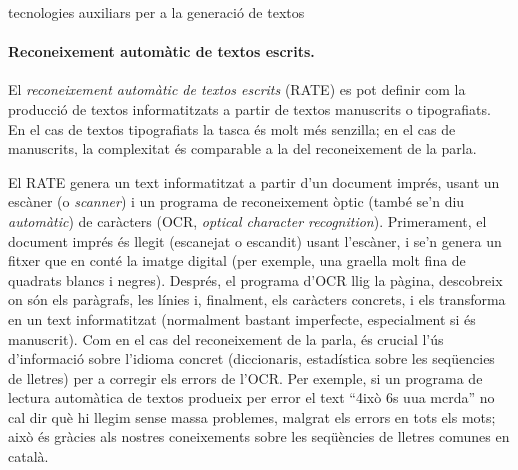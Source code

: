 \begin{persabermes}{tecnologies auxiliars per a la generació de textos}
  \paragraph{Reconeixement automàtic de textos escrits.}
  El \emph{reconeixement automàtic de textos escrits} (RATE) es pot
  definir com la producció de textos informatitzats a partir de textos
  manuscrits o tipografiats. En el cas de textos tipografiats la tasca
  és molt més senzilla; en el cas de manuscrits, la complexitat és
  comparable a la del reconeixement de la parla.
  
  El RATE genera un text informatitzat a partir d'un document imprés,
  usant un escàner (o \emph{scanner}) i un programa de reconeixement
  òptic (també se'n diu {\em automàtic}) de caràcters (OCR,
  \emph{optical character recognition}).  Primerament, el document
  imprés és llegit (escanejat o escandit) usant l'escàner, i se'n
  genera un fitxer que en conté la imatge digital (per exemple, una
  graella molt fina de quadrats blancs i negres).  Després, el
  programa d'OCR llig la pàgina, descobreix on són els paràgrafs, les
  línies i, finalment, els caràcters concrets, i els transforma en un
  text informatitzat (normalment bastant imperfecte, especialment si
  és manuscrit).  Com en el cas del reconeixement de la parla, és
  crucial l'ús d'informació sobre l'idioma concret (diccionaris,
  estadística sobre les seqüencies de lletres) per a corregir els
  errors de l'OCR.  Per exemple, si un programa de lectura automàtica
  de textos produeix per error el text ``4ixò 6s uua mcrda'' no cal
  dir què hi llegim sense massa problemes, malgrat els errors en tots
  els mots; això és gràcies als nostres coneixements sobre les
  seqüències de lletres comunes en català.

\mbox{}
\end{persabermes}




